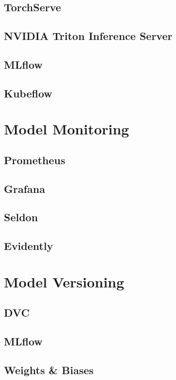 \subsection{TorchServe}
\subsection{NVIDIA Triton Inference Server}
\subsection{MLflow}
\subsection{Kubeflow}
\section{Model Monitoring}
\subsection{Prometheus}
\subsection{Grafana}
\subsection{Seldon}
\subsection{Evidently}
\section{Model Versioning}
\subsection{DVC}
\subsection{MLflow}
\subsection{Weights \& Biases}